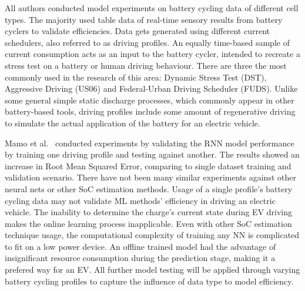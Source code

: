 %
%
All authors conducted model experiments on battery cycling data of different cell types.
The majority used table data of real-time sensory results from battery cyclers to validate efficiencies.
Data gets generated using different current schedulers, also referred to as driving profiles.
An equally time-based sample of current consumption acts as an input to the battery cycler, intended to recreate a stress test on a battery or human driving behaviour.
There are three the most commonly used in the research of this area: Dynamic Stress Test (DST), Aggressive Driving (US06) and Federal-Urban Driving Scheduler (FUDS).
Unlike some general simple static discharge processes, which commonly appear in other battery-based tools, driving profiles include some amount of regenerative driving to simulate the actual application of the battery for an electric vehicle.

%
%
Mamo et al.~\cite{mamo_long_2020} conducted experiments by validating the RNN model performance by training one driving profile and testing against another.
The results showed an increase in Root Mean Squared Error, comparing to single dataset training and validation scenario.
There have not been many similar experiments against other neural nets or other SoC estimation methods.
Usage of a single profile's battery cycling data may not validate ML methods' efficiency in driving an electric vehicle.
The inability to determine the charge's current state during EV driving makes the online learning process inapplicable.
Even with other SoC estimation technique usage, the computational complexity of training any NN is complicated to fit on a low power device.
An offline trained model had the advantage of insignificant resource consumption during the prediction stage, making it a prefered way for an EV.
All further model testing will be applied through varying battery cycling profiles to capture the influence of data type to model efficiency.


